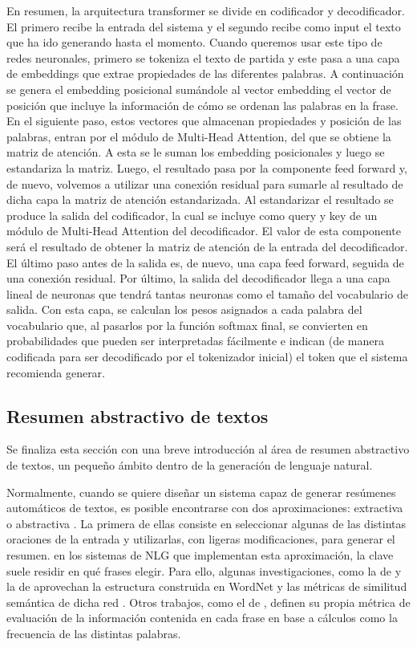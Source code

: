 En resumen, la arquitectura transformer se divide en codificador y decodificador. El primero recibe la entrada del sistema y el segundo recibe como input el texto que ha ido generando hasta el momento. Cuando queremos usar este tipo de redes neuronales, primero se tokeniza el texto de partida y este pasa a una capa de embeddings que extrae propiedades de las diferentes palabras. A continuación se genera el embedding posicional sumándole al vector embedding el vector de posición que incluye la información de cómo se ordenan las palabras en la frase. En el siguiente paso, estos vectores que almacenan propiedades y posición de las palabras, entran por el módulo de Multi-Head Attention, del que se obtiene la matriz de atención. A esta se le suman los embedding posicionales y luego se estandariza la matriz. Luego, el resultado pasa por la componente feed forward y, de nuevo, volvemos a utilizar una conexión residual para sumarle al resultado de dicha capa la matriz de atención estandarizada. Al estandarizar el resultado se produce la salida del codificador, la cual se incluye como query y key de un módulo de Multi-Head Attention del decodificador. El valor de esta componente será el resultado de obtener la matriz de atención de la entrada del decodificador. El último paso antes de la salida es, de nuevo, una capa feed forward, seguida de una conexión residual. Por último, la salida del decodificador llega a una capa lineal de neuronas que tendrá tantas neuronas como el tamaño del vocabulario de salida. Con esta capa, se calculan los pesos asignados a cada palabra del vocabulario que, al pasarlos por la función softmax final, se convierten en probabilidades que pueden ser interpretadas fácilmente e indican (de manera codificada para ser decodificado por el tokenizador inicial) el token que el sistema recomienda generar.

\subsection{Resumen abstractivo de textos}\label{ss:resumen}
Se finaliza esta sección con una breve introducción al área de resumen abstractivo de textos, un pequeño ámbito dentro de la generación de lenguaje natural.

Normalmente, cuando se quiere diseñar un sistema capaz de generar resúmenes automáticos de textos, es posible encontrarse con dos aproximaciones: extractiva o abstractiva \citep{mani2001automatic}. La primera de ellas consiste en seleccionar algunas de las distintas oraciones de la entrada y utilizarlas, con ligeras modificaciones, para generar el resumen. en los sistemas de NLG que implementan esta aproximación, la clave suele residir en qué frases elegir. Para ello, algunas investigaciones, como la de \cite{plaza2010automatic} y la de \cite{pal2014approach} aprovechan la estructura construida en WordNet \citep{miller1995wordnet} y las métricas de similitud semántica de dicha red \citep{pedersen2004wordnet}. Otros trabajos, como el de \cite{macdonald2016summarising}, definen su propia métrica de evaluación de la información contenida en cada frase en base a cálculos como la frecuencia de las distintas palabras.


